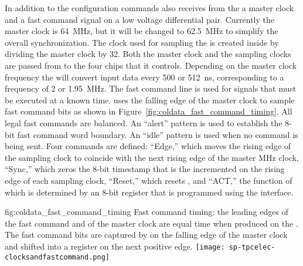 In addition to the configuration commands  also receives from
the  a master clock and a fast command signal on a low voltage 
differential pair. Currently the master clock is \SI{64}{MHz}, but it will be
changed to \SI{62.5}{MHz} to simplify the overall   
synchronization. The clock used for sampling the  is created inside
 by dividing the master clock by 32. Both the master clock and
the  sampling clocks are passed from  to the four
 chips that it controls. Depending on the master clock frequency
the  will convert input data every \num{500} or \SI{512}{ns}, 
corresponding to a frequency of \num{2} or \SI{1.95}{MHz}. The fast command 
line is used for signals that must be executed at a known time.  
uses the falling edge of the master clock to sample fast command bits as shown 
in Figure~\ref{fig:coldata_fast_command_timing}. All legal fast commands 
are  balanced. An ``alert'' pattern is used to establish the 8-bit 
fast command word boundary. An ``idle'' pattern is used when no command is being 
sent. Four commands are defined: ``Edge,'' which moves the rising edge of the 
 sampling clock to coincide with the next rising edge of the 
master MHz clock, ``Sync,'' which zeros the 8-bit timestamp that is the incremented 
on the rising edge of each  sampling clock, ``Reset,'' which resets 
, and ``ACT,'' the function of which is determined by an 8-bit 
register that is programmed using the  interface.  

\begin{dunefigure}
{fig:coldata_fast_command_timing}
{Fast command timing: the leading edges of the fast command and of the master 
clock are equal time when produced on the . The fast command bits 
are captured by  on the falling edge of the master clock and 
shifted into a register on the next positive edge.}
\texttt{[image: sp-tpcelec-clocksandfastcommand.png]}
\end{dunefigure}

